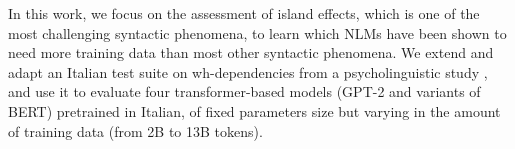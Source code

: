 
In this work, we focus on the assessment of island effects, which is one of the most challenging syntactic phenomena, to learn which NLMs have been shown to need more training data than most other syntactic phenomena. We extend and adapt an Italian test suite on wh-dependencies from a psycholinguistic study \citep{sprouse2016experimental}, and use it to evaluate four transformer-based models (GPT-2 and variants of BERT) pretrained in Italian, of fixed parameters size but varying in the amount of training data (from 2B to 13B tokens). %

